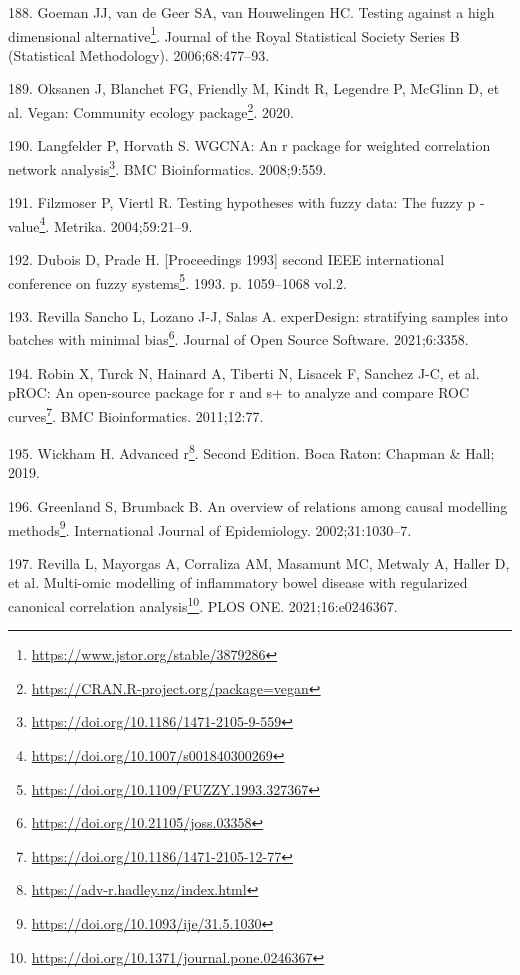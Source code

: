 \documentclass[
  a4paper,
]{book}
\DeclareRobustCommand{\href}[2]{#2\footnote{\url{#1}}}
\newlength{\cslhangindent}
\newlength{\cslentryspacingunit} %
\newenvironment{CSLReferences}[2] %
 {%
  \setlength{\parindent}{0pt}
  \ifodd #1
  \let\oldpar\par
  \def\par{\hangindent=\cslhangindent\oldpar}
  \fi
  \setlength{\parskip}{#2\cslentryspacingunit}
 }%
 {}
\begin{document}
\begin{CSLReferences}{0}{0}
\leavevmode{}%
188. Goeman JJ, van de Geer SA, van Houwelingen HC. \href{https://www.jstor.org/stable/3879286}{Testing against a high dimensional alternative}. Journal of the Royal Statistical Society Series B (Statistical Methodology). 2006;68:477--93.

\leavevmode{}%
189. Oksanen J, Blanchet FG, Friendly M, Kindt R, Legendre P, McGlinn D, et al. \href{https://CRAN.R-project.org/package=vegan}{Vegan: Community ecology package}. 2020.

\leavevmode{}%
190. Langfelder P, Horvath S. \href{https://doi.org/10.1186/1471-2105-9-559}{WGCNA: An r package for weighted correlation network analysis}. BMC Bioinformatics. 2008;9:559.

\leavevmode{}%
191. Filzmoser P, Viertl R. \href{https://doi.org/10.1007/s001840300269}{Testing hypotheses with fuzzy data: The fuzzy p -value}. Metrika. 2004;59:21--9.

\leavevmode{}%
192. Dubois D, Prade H. \href{https://doi.org/10.1109/FUZZY.1993.327367}{{[}Proceedings 1993{]} second IEEE international conference on fuzzy systems}. 1993. p. 1059--1068 vol.2.

\leavevmode{}%
193. Revilla Sancho L, Lozano J-J, Salas A. \href{https://doi.org/10.21105/joss.03358}{experDesign: stratifying samples into batches with minimal bias}. Journal of Open Source Software. 2021;6:3358.

\leavevmode{}%
194. Robin X, Turck N, Hainard A, Tiberti N, Lisacek F, Sanchez J-C, et al. \href{https://doi.org/10.1186/1471-2105-12-77}{pROC: An open-source package for r and s+ to analyze and compare ROC curves}. BMC Bioinformatics. 2011;12:77.

\leavevmode{}%
195. Wickham H. \href{https://adv-r.hadley.nz/index.html}{Advanced r}. Second Edition. Boca Raton: Chapman \& Hall; 2019.

\leavevmode{}%
196. Greenland S, Brumback B. \href{https://doi.org/10.1093/ije/31.5.1030}{An overview of relations among causal modelling methods}. International Journal of Epidemiology. 2002;31:1030--7.

\leavevmode{}%
197. Revilla L, Mayorgas A, Corraliza AM, Masamunt MC, Metwaly A, Haller D, et al. \href{https://doi.org/10.1371/journal.pone.0246367}{Multi-omic modelling of inflammatory bowel disease with regularized canonical correlation analysis}. PLOS ONE. 2021;16:e0246367.


\end{CSLReferences}
\end{document}
